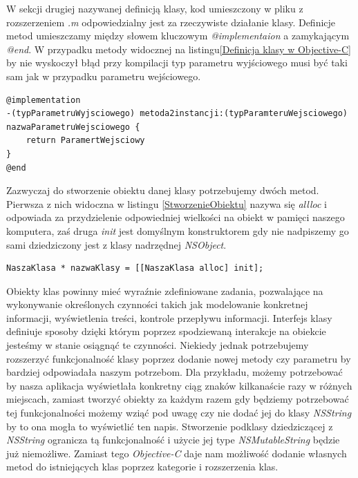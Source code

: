\documentclass{iiuwb}
\begin{document}
W sekcji drugiej nazywanej definicją klasy, kod umieszczony w pliku z rozszerzeniem \textit{.m} odpowiedzialny jest za rzeczywiste działanie klasy. Definicje metod umieszczamy między słowem kluczowym \textit{@implementaion} a zamykającym \textit{@end}. W przypadku metody widocznej na listingu\ref{Definicja klasy w Objective-C} by nie wyskoczył błąd przy kompilacji typ parametru wyjściowego musi być taki sam jak w przypadku parametru wejściowego.
\begin{lstlisting}[label=Definicja klasy w Objective-C, caption=Definicje klasy w Objective-C umieszczamy w pliku z rozszerzeniem .m]
@implementation
-(typParametruWyjsciowego) metoda2instancji:(typParamteruWejsciowego) nazwaParametruWejsciowego {
	return ParamertWejsciowy
}
@end
\end{lstlisting}

Zazwyczaj do stworzenie obiektu danej klasy potrzebujemy dwóch metod. Pierwsza z nich widoczna w listingu \ref{StworzenieObiektu} nazywa się \textit{allloc} i odpowiada za przydzielenie odpowiedniej wielkości na obiekt w pamięci naszego komputera, zaś druga \textit{init} jest domyślnym konstruktorem gdy nie nadpiszemy go sami dziedziczony jest z klasy nadrzędnej \textit{NSObject}.
\begin{lstlisting}[label=StworzenieObiektu, caption=Instrukcja stworzenia obiektu.]
NaszaKlasa * nazwaKlasy = [[NaszaKlasa alloc] init];
\end{lstlisting}

Obiekty klas powinny mieć wyraźnie zdefiniowane zadania, pozwalające na  wykonywanie określonych czynności takich jak modelowanie konkretnej informacji, wyświetlenia treści, kontrole przepływu informacji. Interfejs klasy definiuje sposoby dzięki którym poprzez spodziewaną interakcje na obiekcie jesteśmy w stanie osiągnąć te czynności. Niekiedy jednak potrzebujemy rozszerzyć funkcjonalność klasy poprzez dodanie nowej metody czy parametru by bardziej odpowiadała naszym potrzebom. Dla przykładu, możemy potrzebować by nasza aplikacja wyświetlała konkretny ciąg znaków kilkanaście razy w różnych miejscach, zamiast tworzyć obiekty za każdym razem gdy będziemy potrzebować tej funkcjonalności możemy wziąć pod uwagę czy nie dodać jej do klasy \textit{NSString} by to ona mogła to wyświetlić ten napis. Stworzenie podklasy dziedziczącej z \textit{NSString} ogranicza tą funkcjonalność i użycie jej type \textit{NSMutableString} będzie już niemożliwe. Zamiast tego \textit{Objective-C} daje nam możliwość dodanie własnych metod do istniejących klas poprzez kategorie i rozszerzenia klas. 
\end{document}
